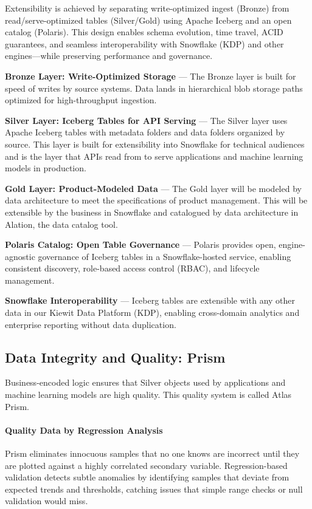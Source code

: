 \documentclass[12pt, a4paper]{article}
\begin{document}
Extensibility is achieved by separating write-optimized ingest (Bronze) from read/serve-optimized tables (Silver/Gold) using Apache Iceberg and an open catalog (Polaris). This design enables schema evolution, time travel, ACID guarantees, and seamless interoperability with Snowflake (KDP) and other engines—while preserving performance and governance.

\textbf{Bronze Layer: Write-Optimized Storage} — The Bronze layer is built for speed of writes by source systems. Data lands in hierarchical blob storage paths optimized for high-throughput ingestion.

\textbf{Silver Layer: Iceberg Tables for API Serving} — The Silver layer uses Apache Iceberg tables with metadata folders and data folders organized by source. This layer is built for extensibility into Snowflake for technical audiences and is the layer that APIs read from to serve applications and machine learning models in production.

\textbf{Gold Layer: Product-Modeled Data} — The Gold layer will be modeled by data architecture to meet the specifications of product management. This will be extensible by the business in Snowflake and catalogued by data architecture in Alation, the data catalog tool.

\textbf{Polaris Catalog: Open Table Governance} — Polaris provides open, engine-agnostic governance of Iceberg tables in a Snowflake-hosted service, enabling consistent discovery, role-based access control (RBAC), and lifecycle management.

\textbf{Snowflake Interoperability} — Iceberg tables are extensible with any other data in our Kiewit Data Platform (KDP), enabling cross-domain analytics and enterprise reporting without data duplication.

\subsection{Data Integrity and Quality: Prism}

Business-encoded logic ensures that Silver objects used by applications and machine learning models are high quality. This quality system is called Atlas Prism.

\paragraph{Quality Data by Regression Analysis}
Prism eliminates innocuous samples that no one knows are incorrect until they are plotted against a highly correlated secondary variable. Regression-based validation detects subtle anomalies by identifying samples that deviate from expected trends and thresholds, catching issues that simple range checks or null validation would miss.
\end{document}
